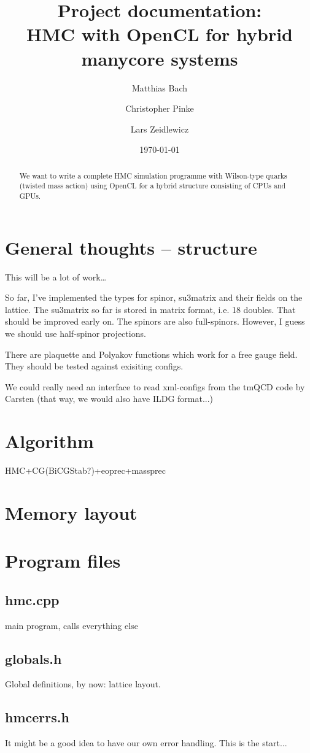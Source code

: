 \documentclass[a4paper,11pt]{article}
\title{Project documentation:\\
       \textbf{HMC with OpenCL for hybrid manycore systems}
}
\author{Matthias Bach \and Christopher Pinke \and Lars Zeidlewicz}
\date{\today}
\begin{document}
\maketitle
\begin{abstract}
We want to write a complete HMC simulation programme with Wilson-type quarks (twisted mass action) using OpenCL for a hybrid structure consisting of CPUs and GPUs.
\end{abstract}

\tableofcontents

\section{General thoughts -- structure}
This will be a lot of work\ldots

So far, I've implemented the types for spinor, su3matrix and their fields on the lattice. The su3matrix so far is stored in matrix format, i.e. 18 doubles. That should be improved early on. The spinors are also full-spinors. However, I guess we should use half-spinor projections.

There are plaquette and Polyakov functions which work for a free gauge field. They should be tested against exisiting configs.

We could really need an interface to read xml-configs from the tmQCD code by Carsten (that way, we would also have ILDG format...)

\section{Algorithm}
HMC+CG(BiCGStab?)+eoprec+massprec

\section{Memory layout}

\section{Program files}
\subsection{hmc.cpp}
main program, calls everything else
\subsection{globals.h}
Global definitions, by now: lattice layout.
\subsection{hmcerrs.h}
It might be a good idea to have our own error handling. This is the start...
\end{document}

